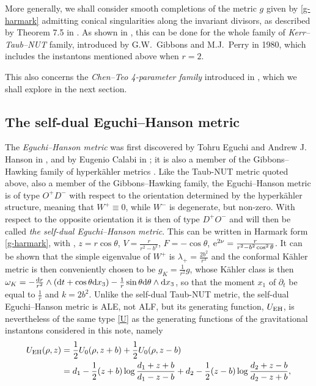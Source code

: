 \documentclass[pdftex]{sigma}
\numberwithin{equation}{section}
\begin{document}
More generally, we shall consider smooth completions of the metric $g$ given by \eqref{g-harmark} admitting conical singularities along the invariant divisors, as described by Theorem 7.5 in \cite[Section~7]{BG}. As shown in \cite[Section~7]{BG}, this can be done for the whole family of {\it Kerr--Taub--NUT} family, introduced by G.W.~Gibbons and M.J.~Perry in 1980, which includes the instantons mentioned above when $r = 2$.

This also concerns the {\it Chen--Teo {\rm 4}-parameter family} introduced in \cite{CT3}, which we shall explore in the next section.

\subsection{The self-dual Eguchi--Hanson metric}\label{sec:self-dual-eguchi} The {\it Eguchi--Hanson metric} was first discovered by Tohru Eguchi and Andrew J. Hanson in \cite{EH}, and by Eugenio Calabi in \cite{calabi}; it is also a member of the Gibbons--Hawking family of hyperk\"ahler metrics \cite{GH}. Like the Taub-NUT metric quoted above, also a member of the Gibbons--Hawking family, the Eguchi--Hanson metric is of type $O^+ D^-$ with respect to the orientation determined by the hyperk\"ahler structure, meaning that $W^+ \equiv 0$, while $W^-$ is degenerate, but non-zero. With respect to the opposite
orientation it is then of type $D^+O^-$ and will then be called {\it the self-dual Eguchi--Hanson metric}. This can be written in Harmark form \eqref{g-harmark}, with , $z = r \cos{\theta}$, $V = \frac{r}{r^2 - b^2}$, $F = - \cos{\theta}$, ${\rm e}^{2 \nu} = \frac{r}{r^2 - b^2 \cos ^2{\theta}}$. It can be shown that the simple eigenvalue of $W^+$ is $\lambda _+ = \frac{2 b ^2}{r ^3}$ and the conformal K\"ahler metric is then conveniently chosen to be $g _K = \frac{1}{r^2} g$, whose K\"ahler class is then $\omega _K = - \frac{{\rm d}r}{r^2} \wedge ({\rm d}t + \cos{\theta} {\rm d} x_3) - \frac{1}{r} \sin{\theta} {\rm d}\theta \wedge {\rm d} x_3$, so that the moment $x_1$ of $\partial _t$ be equal to $\frac{1}{r}$ and $k = 2 b^2$.
Unlike the self-dual Taub-NUT metric, the self-dual Eguchi--Hanson metric is ALE, not ALF, but its generating function, $U_{\rm EH}$, is nevertheless of the same type \eqref{U} as the generating functions of the gravitational instantons considered in this note, namely
\begin{align*} U_{\rm EH} (\rho, z) & = \frac{1}{2} U_0(\rho, z + b) + \frac{1}{2} U_0 (\rho, z - b) \\ & = d_1 - \frac{1}{2} (z + b) \log{\frac{d_1 + z + b}{d_1 - z - b}} + d_2 - \frac{1}{2} (z - b) \log{\frac{d_2 + z - b}{d_2 - z + b}}, \end{align*}
\end{document}
